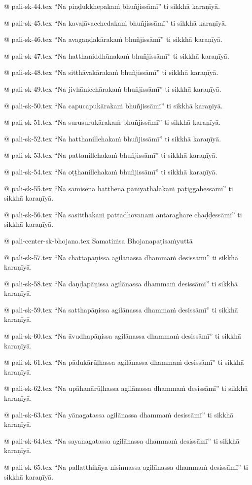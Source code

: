@ pali-sk-44.tex
“Na piṇḍukkhepakaṁ bhuñjissāmī” ti sikkhā karaṇīyā.

@ pali-sk-45.tex
“Na kavaḷāvacchedakaṁ bhuñjissāmī” ti sikkhā karaṇīyā.

@ pali-sk-46.tex
“Na avagaṇḍakārakaṁ bhuñjissāmī” ti sikkhā karaṇīyā.

@ pali-sk-47.tex
“Na hatthaniddhūnakaṁ bhuñjissāmī” ti sikkhā karaṇīyā.

@ pali-sk-48.tex
“Na sitthāvakārakaṁ bhuñjissāmī” ti sikkhā karaṇīyā.

@ pali-sk-49.tex
“Na jivhānicchārakaṁ bhuñjissāmī” ti sikkhā karaṇīyā.

@ pali-sk-50.tex
“Na capucapukārakaṁ bhuñjissāmī” ti sikkhā karaṇīyā.

@ pali-sk-51.tex
“Na surusurukārakaṁ bhuñjissāmī” ti sikkhā karaṇīyā.

@ pali-sk-52.tex
“Na hatthanillehakaṁ bhuñjissāmī” ti sikkhā karaṇīyā.

@ pali-sk-53.tex
“Na pattanillehakaṁ bhuñjissāmī” ti sikkhā karaṇīyā.

@ pali-sk-54.tex
“Na oṭṭhanillehakaṁ bhuñjissāmī” ti sikkhā karaṇīyā.

@ pali-sk-55.tex
“Na sāmisena hatthena pānīyathālakaṁ paṭiggahessāmī” ti sikkhā karaṇīyā.

@ pali-sk-56.tex
“Na sasitthakaṁ pattadhovanaṁ antaraghare chaḍḍessāmī” ti sikkhā karaṇīyā.

@ pali-center-sk-bhojana.tex
Samatiṁsa Bhojanapaṭisaṁyuttā

@ pali-sk-57.tex
“Na chattapāṇissa agilānassa dhammaṁ desissāmī” ti sikkhā karaṇīyā.

@ pali-sk-58.tex
“Na daṇḍapāṇissa agilānassa dhammaṁ desissāmī” ti sikkhā karaṇīyā.

@ pali-sk-59.tex
“Na satthapāṇissa agilānassa dhammaṁ desissāmī” ti sikkhā karaṇīyā.

@ pali-sk-60.tex
“Na āvudhapāṇissa agilānassa dhammaṁ desissāmī” ti sikkhā karaṇīyā.

@ pali-sk-61.tex
“Na pādukārūḷhassa agilānassa dhammaṁ desissāmī” ti sikkhā karaṇīyā.

@ pali-sk-62.tex
“Na upāhanārūḷhassa agilānassa dhammaṁ desissāmī” ti sikkhā karaṇīyā.

@ pali-sk-63.tex
“Na yānagatassa agilānassa dhammaṁ desissāmī” ti sikkhā karaṇīyā.

@ pali-sk-64.tex
“Na sayanagatassa agilānassa dhammaṁ desissāmī” ti sikkhā karaṇīyā.

@ pali-sk-65.tex
“Na pallatthikāya nisinnassa agilānassa dhammaṁ desissāmī” ti sikkhā karaṇīyā.

